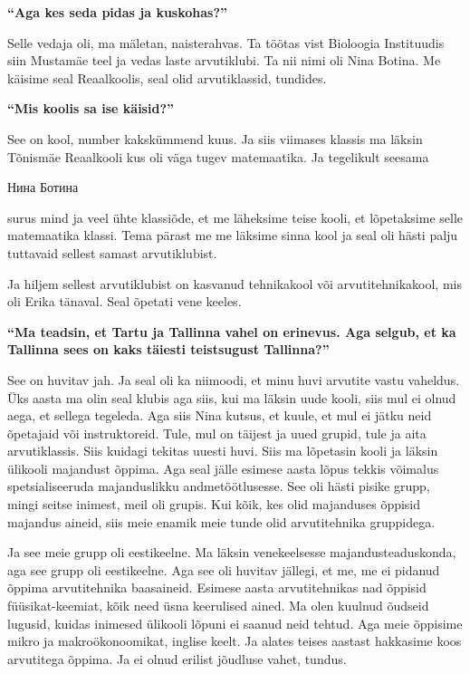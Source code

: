 \textbf{\enquote{Aga kes seda pidas ja kuskohas?}}

Selle vedaja oli, ma mäletan, naisterahvas. Ta töötas vist Bioloogia
Instituudis siin Mustamäe teel ja vedas laste arvutiklubi. Ta nii nimi oli
Nina Botina. Me käisime seal
Reaalkoolis, seal olid arvutiklassid, tundides.

\textbf{\enquote{Mis koolis sa ise käisid?}}

See on kool, number kakskümmend kuus. Ja
siis viimases klassis ma läksin Tõnismäe Reaalkooli kus oli väga tugev matemaatika. Ja tegelikult seesama
\begin{russian}Нина Ботина\end{russian} surus mind ja veel ühte klassiõde, et
me läheksime teise kooli, et lõpetaksime selle matemaatika klassi. Tema pärast
me me läksime sinna kool ja seal oli hästi palju tuttavaid sellest samast
arvutiklubist.

Ja hiljem sellest arvutiklubist on kasvanud tehnikakool või arvutitehnikakool,
mis oli Erika tänaval. Seal õpetati vene keeles. 

\textbf{\enquote{Ma teadsin, et Tartu ja Tallinna vahel on erinevus. Aga selgub, et ka Tallinna sees on kaks täiesti teistsugust Tallinna?}}

See on huvitav jah. Ja seal oli ka niimoodi, et minu huvi arvutite vastu
vaheldus. Üks aasta ma olin seal klubis aga siis, kui ma läksin uude kooli,
siis mul ei olnud aega, et sellega tegeleda. Aga siis Nina kutsus, et kuule,
et mul ei jätku neid õpetajaid või instruktoreid. Tule, mul on täijest ja uued
grupid, tule ja aita arvutiklassis. Siis kuidagi tekitas uuesti huvi. Siis ma
lõpetasin kooli ja läksin ülikooli majandust õppima. Aga seal jälle esimese aasta lõpus tekkis
võimalus spetsialiseeruda majanduslikku andmetöötlusesse. See oli hästi pisike
grupp, mingi seitse inimest, meil oli grupis. Kui kõik, kes olid majanduses
õppisid majandus aineid, siis meie enamik meie tunde olid arvutitehnika
gruppidega.

Ja see meie grupp oli eestikeelne. Ma läksin venekeelsesse majandusteaduskonda,
aga see grupp oli eestikeelne. Aga see oli huvitav jällegi, et me, me ei
pidanud õppima arvutitehnika baasaineid. Esimese aasta arvutitehnikas nad
õppisid füüsikat-keemiat, kõik need üsna keerulised ained. Ma olen kuulnud
õudseid lugusid, kuidas inimesed ülikooli lõpuni ei saanud neid tehtud. Aga
meie õppisime mikro ja makroökonoomikat, inglise keelt. Ja alates teises
aastast hakkasime koos arvutitega õppima. Ja ei olnud erilist jõudluse vahet,
tundus.

